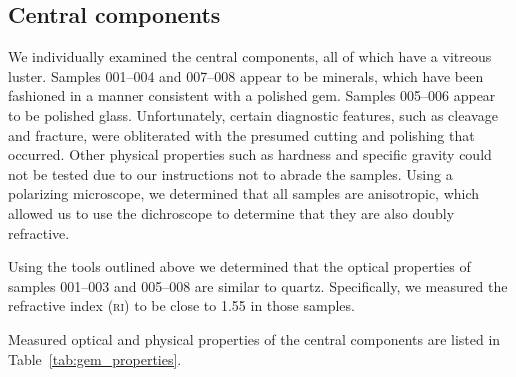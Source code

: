 \documentclass[10pt]{article}
\theoremstyle{definition}
\begin{document}
\subsection{Central components}
We individually examined the central components, all of which have a vitreous luster.
Samples 001--004 and 007--008 appear to be minerals, which have been fashioned in a manner consistent with a polished gem.
Samples 005--006 appear to be polished glass.
Unfortunately, certain diagnostic features, such as cleavage and fracture, were obliterated with the presumed cutting and polishing that occurred.
Other physical properties such as hardness and specific gravity could not be tested due to our instructions not to abrade the samples.
Using a polarizing microscope, we determined that all samples are anisotropic, which allowed us to use the dichroscope to determine that they are also doubly refractive.

Using the tools outlined above we determined that the optical properties of samples 001--003 and 005--008 are similar to quartz.
Specifically, we measured the refractive index (\textsc{ri}) to be close to 1.55 in those samples.  

Measured optical and physical properties of the central components are listed in Table~\ref{tab:gem_properties}.
\end{document}
